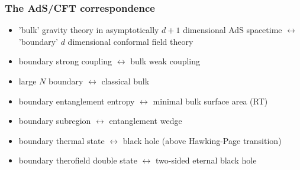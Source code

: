 \documentclass[10pt,aspectratio=169]{beamer}
\begin{document}
\begin{frame}
\frametitle{The AdS/CFT correspondence}



\begin{minipage}[t]{0.48\linewidth}

\begin{itemize}

\item 'bulk' gravity theory in asymptotically $d+1$ dimensional AdS spacetime $\leftrightarrow$ 'boundary' $d$ dimensional conformal field theory

\item boundary strong coupling $\leftrightarrow$ bulk weak coupling

\item large $N$ boundary $\leftrightarrow$ classical bulk

\item boundary entanglement entropy $\leftrightarrow$ minimal bulk surface area (RT)

\item boundary subregion $\leftrightarrow$ entanglement wedge

\item boundary thermal state $\leftrightarrow$ black hole (above Hawking-Page transition)

\item boundary therofield double state $\leftrightarrow$ two-sided eternal black hole

\end{itemize}

\end{minipage}
%
\hfill
%
\begin{minipage}[t]{0.48\linewidth}

\begin{figure}
    \begin{center}
    

\end{center}
\end{figure}
\end{minipage}
\end{frame}
\end{document}
